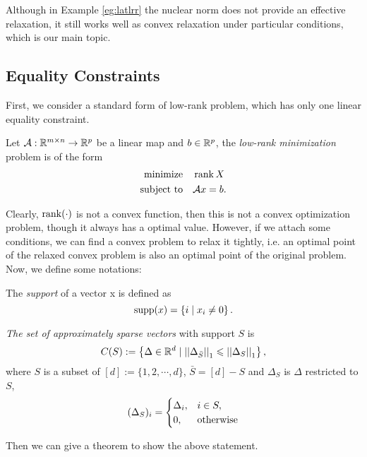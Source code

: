 \documentclass[11pt]{article}
\begin{document}
Although in Example \ref{eg:latlrr} the nuclear norm does not provide an effective relaxation, it still works well as convex relaxation under particular conditions, which is our main topic.

\subsection{Equality Constraints}

First, we consider a standard form of low-rank problem, which has only one linear equality constraint.
\begin{definition}
    Let \(\mathcal{A}:\mathbb R^{m\times n}\to \mathbb R^p\) be a linear map and \(b\in \mathbb R^p\), the \emph{low-rank minimization} problem is of the form 
    \[\begin{aligned}
        \textnormal{minimize}\quad & \operatorname{rank} X\\
        \textnormal{subject to}\quad & \mathcal Ax=b.
    \end{aligned}\]
\end{definition}

Clearly, \(\operatorname{rank}(\cdot)\) is not a convex function, then this is not a convex optimization problem, though it always has a optimal value. However, if we attach some conditions, we can find a convex problem to relax it tightly, i.e. an optimal point of the relaxed convex problem is also an optimal point of the original problem. Now, we define some notations:

\begin{definition}[Support]
    The \emph{support} of a vector x is defined as
    \[\operatorname{supp}(x) = \left\{i \mid x_i \neq 0\right\}.\]
\end{definition}

\begin{definition}
    \emph{The set of approximately sparse vectors} with support \(S\) is 
    \[C(S):=\left\{\Delta \in \mathbb R^d \mid \left|\left|\Delta_{\bar{S}}\right|\right|_1\leqslant \left|\left|\Delta_S\right|\right|_1\right\},\]
    where \(S\) is a subset of \([d]:=\{1,2,\cdots,d\}\), \(\bar{S}=[d]-S\) and \(\Delta_S\) is \(\Delta\) restricted to \(S\),
    \[(\Delta_S)_i = \begin{cases}
        \Delta_i, & i \in S,\\
        0, & \textnormal{otherwise}
    \end{cases}\]
\end{definition}

Then we can give a theorem to show the above statement.
\end{document}
